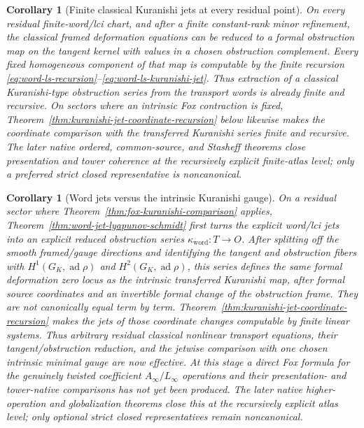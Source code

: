 \documentclass[11pt]{article}
\newtheorem{corollary}[theorem]{Corollary}
\theoremstyle{definition}
\begin{document}
\begin{corollary}[Finite classical Kuranishi jets at every residual point]\label{cor:finite-classical-kuranishi-jets}
On every residual finite-word/lci chart, and after a finite constant-rank
minor refinement, the classical framed deformation equations can be reduced
to a formal obstruction map on the tangent kernel with values in a chosen
obstruction complement.  Every fixed homogeneous component of that map is
computable by the finite recursion
\eqref{eq:word-ls-recursion}--\eqref{eq:word-ls-kuranishi-jet}.  Thus extraction of a classical Kuranishi-type obstruction series from the
transport words is already finite and recursive.  On sectors where an
intrinsic Fox contraction is fixed, Theorem~\ref{thm:kuranishi-jet-coordinate-recursion}
below likewise makes the coordinate comparison with the transferred Kuranishi
series finite and recursive.  The later native ordered, common-source, and
Stasheff theorems close presentation and tower coherence at the recursively
explicit finite-atlas level; only a preferred strict closed representative is
noncanonical.
\end{corollary}

\begin{corollary}[Word jets versus the intrinsic Kuranishi gauge]\label{cor:word-jets-kuranishi-boundary}
On a residual sector where Theorem~\ref{thm:fox-kuranishi-comparison} applies,
Theorem~\ref{thm:word-jet-lyapunov-schmidt} first turns the explicit word/lci
jets into an explicit reduced obstruction series
$\kappa_{\mathrm{word}}:T\to O$.  After splitting off the smooth framed/gauge
directions and identifying the tangent and obstruction fibers with
$H^1(G_K,\operatorname{ad}\rho)$ and $H^2(G_K,\operatorname{ad}\rho)$, this
series defines the same formal deformation zero locus as the intrinsic
transferred Kuranishi map, after formal source coordinates and an invertible
formal change of the obstruction frame.  They are not canonically equal term
by term.  Theorem~\ref{thm:kuranishi-jet-coordinate-recursion} makes the jets
of those coordinate changes computable by finite linear systems.  Thus
arbitrary residual \emph{classical} nonlinear transport equations, their
tangent/obstruction reduction, and the jetwise comparison with one chosen
intrinsic minimal gauge are now effective.  At this stage a direct Fox formula
for the genuinely twisted coefficient $A_\infty/L_\infty$ operations and their
presentation- and tower-native comparisons has not yet been produced.  The later
native higher-operation and globalization theorems close this at the recursively
explicit atlas level; only optional strict closed representatives remain noncanonical.
\end{corollary}
\end{document}
